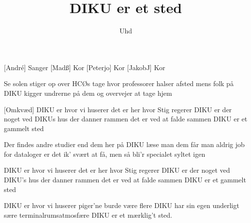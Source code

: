 \documentclass[a4paper,11pt]{article}
\title{DIKU er et sted}
\author{Uhd}
\begin{document}
\maketitle

\begin{roles}
[Andr\'e] Sanger
[Madß] Kor
[Peterjo] Kor
[JakobJ] Kor
\end{roles}

\begin{props}
\end{props}

\begin{song}

 Se solen stiger op over HCØs tage
hvor professorer halser afsted
mens folk på DIKU kigger undrerne på dem
og overvejer at tage hjem

[Omkvæd] DIKU er hvor
vi huserer
det er her hvor
Stig regerer
DIKU er der noget ved
DIKUs hus der
danner rammen
det er ved at
falde sammen
DIKU er et gammelt sted

 Der findes andre studier end dem her på DIKU
læse man dem får man aldrig job
for dataloger er det ik' svært at få, men
så bli'r specialet syltet igen

 DIKU er hvor
vi huserer
det er her hvor
Stig regerer
DIKU er der noget ved
DIKU's hus der
danner rammen
det er ved at
falde sammen
DIKU er et gammelt sted


 DIKU er hvor
vi huserer
piger'ne burde
være flere
DIKU har sin egen 
underligt sære
terminalrumsatmosfære
DIKU er et mærklig't sted.

\end{song}
\end{document}
